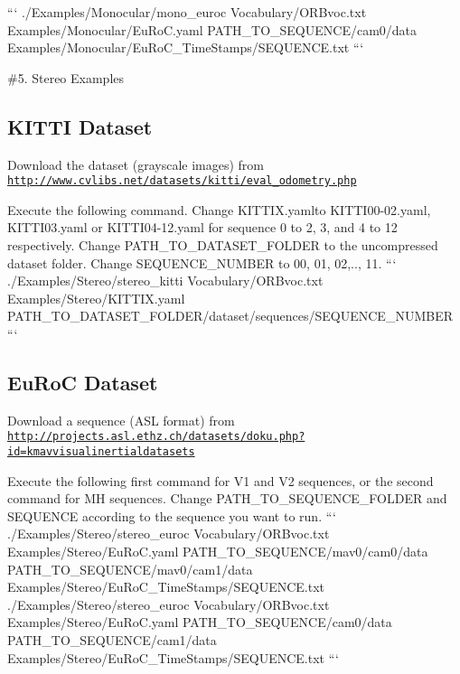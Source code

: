 ``` ./\-Examples/\-Monocular/mono\-\_\-euroc Vocabulary/\-O\-R\-Bvoc.\-txt Examples/\-Monocular/\-Eu\-Ro\-C.\-yaml P\-A\-T\-H\-\_\-\-T\-O\-\_\-\-S\-E\-Q\-U\-E\-N\-C\-E/cam0/data Examples/\-Monocular/\-Eu\-Ro\-C\-\_\-\-Time\-Stamps/\-S\-E\-Q\-U\-E\-N\-C\-E.\-txt ```

\#5. Stereo Examples

\subsection*{K\-I\-T\-T\-I Dataset}


\begin{DoxyEnumerate}
\item Download the dataset (grayscale images) from \href{http://www.cvlibs.net/datasets/kitti/eval_odometry.php}{\tt http\-://www.\-cvlibs.\-net/datasets/kitti/eval\-\_\-odometry.\-php}
\item Execute the following command. Change {\ttfamily K\-I\-T\-T\-I\-X.\-yaml}to K\-I\-T\-T\-I00-\/02.\-yaml, K\-I\-T\-T\-I03.\-yaml or K\-I\-T\-T\-I04-\/12.\-yaml for sequence 0 to 2, 3, and 4 to 12 respectively. Change {\ttfamily P\-A\-T\-H\-\_\-\-T\-O\-\_\-\-D\-A\-T\-A\-S\-E\-T\-\_\-\-F\-O\-L\-D\-E\-R} to the uncompressed dataset folder. Change {\ttfamily S\-E\-Q\-U\-E\-N\-C\-E\-\_\-\-N\-U\-M\-B\-E\-R} to 00, 01, 02,.., 11. ``` ./\-Examples/\-Stereo/stereo\-\_\-kitti Vocabulary/\-O\-R\-Bvoc.\-txt Examples/\-Stereo/\-K\-I\-T\-T\-I\-X.\-yaml P\-A\-T\-H\-\_\-\-T\-O\-\_\-\-D\-A\-T\-A\-S\-E\-T\-\_\-\-F\-O\-L\-D\-E\-R/dataset/sequences/\-S\-E\-Q\-U\-E\-N\-C\-E\-\_\-\-N\-U\-M\-B\-E\-R ```
\end{DoxyEnumerate}

\subsection*{Eu\-Ro\-C Dataset}


\begin{DoxyEnumerate}
\item Download a sequence (A\-S\-L format) from \href{http://projects.asl.ethz.ch/datasets/doku.php?id=kmavvisualinertialdatasets}{\tt http\-://projects.\-asl.\-ethz.\-ch/datasets/doku.\-php?id=kmavvisualinertialdatasets}
\item Execute the following first command for V1 and V2 sequences, or the second command for M\-H sequences. Change P\-A\-T\-H\-\_\-\-T\-O\-\_\-\-S\-E\-Q\-U\-E\-N\-C\-E\-\_\-\-F\-O\-L\-D\-E\-R and S\-E\-Q\-U\-E\-N\-C\-E according to the sequence you want to run. ``` ./\-Examples/\-Stereo/stereo\-\_\-euroc Vocabulary/\-O\-R\-Bvoc.\-txt Examples/\-Stereo/\-Eu\-Ro\-C.\-yaml P\-A\-T\-H\-\_\-\-T\-O\-\_\-\-S\-E\-Q\-U\-E\-N\-C\-E/mav0/cam0/data P\-A\-T\-H\-\_\-\-T\-O\-\_\-\-S\-E\-Q\-U\-E\-N\-C\-E/mav0/cam1/data Examples/\-Stereo/\-Eu\-Ro\-C\-\_\-\-Time\-Stamps/\-S\-E\-Q\-U\-E\-N\-C\-E.\-txt {\ttfamily  } ./\-Examples/\-Stereo/stereo\-\_\-euroc Vocabulary/\-O\-R\-Bvoc.\-txt Examples/\-Stereo/\-Eu\-Ro\-C.\-yaml P\-A\-T\-H\-\_\-\-T\-O\-\_\-\-S\-E\-Q\-U\-E\-N\-C\-E/cam0/data P\-A\-T\-H\-\_\-\-T\-O\-\_\-\-S\-E\-Q\-U\-E\-N\-C\-E/cam1/data Examples/\-Stereo/\-Eu\-Ro\-C\-\_\-\-Time\-Stamps/\-S\-E\-Q\-U\-E\-N\-C\-E.\-txt ```
\end{DoxyEnumerate}

